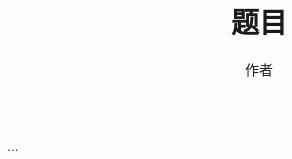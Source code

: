 \documentclass[a4paper,10pt,oneside]{book} %
\title{题目}
\author{作者}
\begin{document}
\maketitle
\tableofcontents
...
\end{document}
